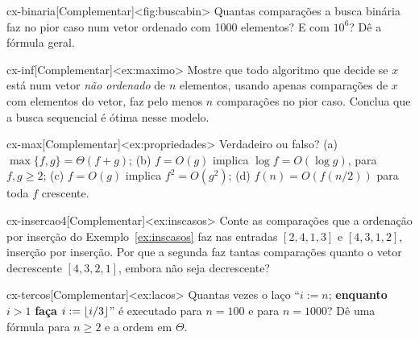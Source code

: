 \begin{exercicio}{cx-binaria}[Complementar]<fig:buscabin>
Quantas comparações a busca binária faz no pior caso num vetor ordenado com 1000 elementos? E com $10^6$? Dê a fórmula geral.
\end{exercicio}
\begin{exercicio}{cx-inf}[Complementar]<ex:maximo>
Mostre que todo algoritmo que decide se $x$ está num vetor \emph{não ordenado} de $n$ elementos, usando apenas comparações de $x$ com elementos do vetor, faz pelo menos $n$ comparações no pior caso. Conclua que a busca sequencial é ótima nesse modelo.
\end{exercicio}
\begin{exercicio}{cx-max}[Complementar]<ex:propriedades>
Verdadeiro ou falso? (a) $\max\{f,g\}=\Theta(f+g)$; (b) $f=O(g)$ implica $\log f=O(\log g)$, para $f,g\ge2$; (c) $f=O(g)$ implica $f^2=O(g^2)$; (d) $f(n)=O(f(n/2))$ para toda $f$ crescente.
\end{exercicio}
\begin{exercicio}{cx-insercao4}[Complementar]<ex:inscasos>
Conte as comparações que a ordenação por inserção do Exemplo~\ref{ex:inscasos} faz nas entradas $[2,4,1,3]$ e $[4,3,1,2]$, inserção por inserção. Por que a segunda faz tantas comparações quanto o vetor decrescente $[4,3,2,1]$, embora não seja decrescente?
\end{exercicio}
\begin{exercicio}{cx-tercos}[Complementar]<ex:lacos>
Quantas vezes o laço ``$i:=n$; \textbf{enquanto} $i>1$ \textbf{faça} $i:=\lfloor i/3\rfloor$'' é executado para $n=100$ e para $n=1000$? Dê uma fórmula para $n\ge2$ e a ordem em $\Theta$.
\end{exercicio}

